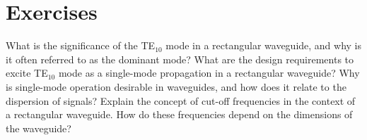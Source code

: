 \section*{Exercises}
\begin{ExerciseList}
\Exercise[label={ex391}] 
What is the significance of the TE$_{10}$ mode in a rectangular waveguide, and why is it often referred to as the dominant mode?
\Exercise[label={ex392}]
What are the design requirements to excite TE$_{10}$ mode as a single-mode propagation
in a rectangular waveguide?
\Exercise[label={ex393}]
Why is single-mode operation desirable in waveguides, and how does it relate to the dispersion of signals?
\Exercise[label={ex394}]
Explain the concept of cut-off frequencies in the context of a rectangular waveguide. How do these frequencies depend on the dimensions of the waveguide?
\end{ExerciseList}
